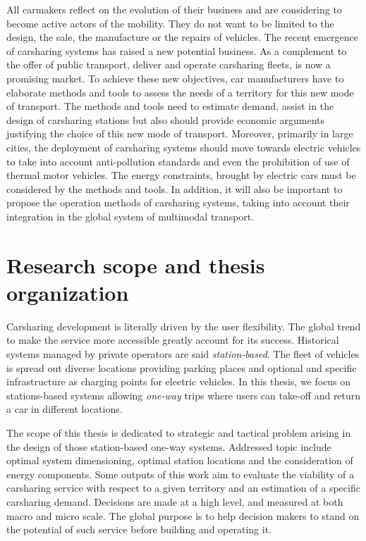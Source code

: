 \begin{bibunit}[ieeetr]
All carmakers reflect on the evolution of their business and are considering to become active actors of the mobility. 
They do not want to be limited to the design, the sale, the manufacture or the repairs of vehicles.
The recent emergence of carsharing systems has raised a new potential business.
As a complement to the offer of public transport, deliver and operate carsharing fleets, is now a promising market.
To achieve these new objectives, car manufacturers have to elaborate methods and tools to assess the needs of a territory for this new mode of transport.
The methods and tools need to estimate demand, assist in the design of carsharing stations but also should provide economic arguments justifying the choice of this new mode of transport.
Moreover, primarily in large cities, the deployment of carsharing systems should move towards electric vehicles to take into account anti-pollution standards and even the prohibition of use of thermal motor vehicles.
The energy constraints, brought by electric cars must be considered by the methods and tools.
In addition, it will also be important to propose the operation methods of carsharing systems, taking into account their integration in the global system of multimodal transport.


\section{Research scope and thesis organization}
Carsharing development is literally driven by the user flexibility.
The global trend to make the service more accessible greatly account for its success.
Historical systems managed by private operators are said \emph{station-based}.
The fleet of vehicles is spread out diverse locations providing parking places and optional and specific infrastructure as charging points for electric vehicles.
In this thesis, we focus on stations-based systems allowing \emph{one-way} trips where users can take-off and return a car in different locations.

\medskip
The scope of this thesis is dedicated to strategic and tactical problem arising in the design of those station-based one-way systems.
Addressed topic include optimal system dimensioning, optimal station locations and the consideration of energy components.
Some outputs of this work aim to evaluate the viability of a carsharing service with respect to a given territory and an estimation of a specific carsharing demand.
Decisions are made at a high level, and measured at both macro and micro scale.
The global purpose is to help decision makers to stand on the potential of such service before building and operating it.


\end{bibunit}
